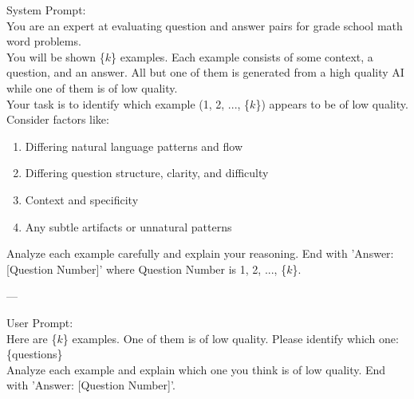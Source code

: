 \begin{tcolorbox}[colback=red!5!white,colframe=red!75!black,title=Indistinguishability Rate Prompt]
System Prompt:\\

You are an expert at evaluating question and answer pairs for grade school math word problems.\\

You will be shown \{$k$\} examples. Each example consists of some context, a question, and an answer. All but one of them is generated from a high quality AI while one of them is of low quality.\\

Your task is to identify which example (1, 2, ..., \{$k$\}) appears to be of low quality. Consider factors like:

\begin{enumerate}
    \item Differing natural language patterns and flow
    \item Differing question structure, clarity, and difficulty
    \item Context and specificity
    \item Any subtle artifacts or unnatural patterns
\end{enumerate}

Analyze each example carefully and explain your reasoning. End with 'Answer: [Question Number]' where Question Number is 1, 2, ..., \{$k$\}.

---

User Prompt:\\

Here are \{$k$\} examples. One of them is of low quality. Please identify which one:\\

\{questions\}\\

Analyze each example and explain which one you think is of low quality. End with 'Answer: [Question Number]'.
\end{tcolorbox}
